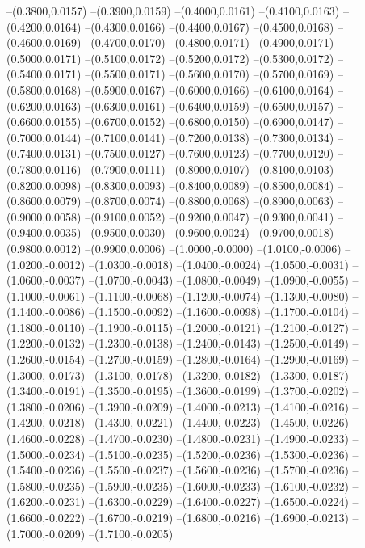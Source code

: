 	--(0.3800,0.0157)
	--(0.3900,0.0159)
	--(0.4000,0.0161)
	--(0.4100,0.0163)
	--(0.4200,0.0164)
	--(0.4300,0.0166)
	--(0.4400,0.0167)
	--(0.4500,0.0168)
	--(0.4600,0.0169)
	--(0.4700,0.0170)
	--(0.4800,0.0171)
	--(0.4900,0.0171)
	--(0.5000,0.0171)
	--(0.5100,0.0172)
	--(0.5200,0.0172)
	--(0.5300,0.0172)
	--(0.5400,0.0171)
	--(0.5500,0.0171)
	--(0.5600,0.0170)
	--(0.5700,0.0169)
	--(0.5800,0.0168)
	--(0.5900,0.0167)
	--(0.6000,0.0166)
	--(0.6100,0.0164)
	--(0.6200,0.0163)
	--(0.6300,0.0161)
	--(0.6400,0.0159)
	--(0.6500,0.0157)
	--(0.6600,0.0155)
	--(0.6700,0.0152)
	--(0.6800,0.0150)
	--(0.6900,0.0147)
	--(0.7000,0.0144)
	--(0.7100,0.0141)
	--(0.7200,0.0138)
	--(0.7300,0.0134)
	--(0.7400,0.0131)
	--(0.7500,0.0127)
	--(0.7600,0.0123)
	--(0.7700,0.0120)
	--(0.7800,0.0116)
	--(0.7900,0.0111)
	--(0.8000,0.0107)
	--(0.8100,0.0103)
	--(0.8200,0.0098)
	--(0.8300,0.0093)
	--(0.8400,0.0089)
	--(0.8500,0.0084)
	--(0.8600,0.0079)
	--(0.8700,0.0074)
	--(0.8800,0.0068)
	--(0.8900,0.0063)
	--(0.9000,0.0058)
	--(0.9100,0.0052)
	--(0.9200,0.0047)
	--(0.9300,0.0041)
	--(0.9400,0.0035)
	--(0.9500,0.0030)
	--(0.9600,0.0024)
	--(0.9700,0.0018)
	--(0.9800,0.0012)
	--(0.9900,0.0006)
	--(1.0000,-0.0000)
	--(1.0100,-0.0006)
	--(1.0200,-0.0012)
	--(1.0300,-0.0018)
	--(1.0400,-0.0024)
	--(1.0500,-0.0031)
	--(1.0600,-0.0037)
	--(1.0700,-0.0043)
	--(1.0800,-0.0049)
	--(1.0900,-0.0055)
	--(1.1000,-0.0061)
	--(1.1100,-0.0068)
	--(1.1200,-0.0074)
	--(1.1300,-0.0080)
	--(1.1400,-0.0086)
	--(1.1500,-0.0092)
	--(1.1600,-0.0098)
	--(1.1700,-0.0104)
	--(1.1800,-0.0110)
	--(1.1900,-0.0115)
	--(1.2000,-0.0121)
	--(1.2100,-0.0127)
	--(1.2200,-0.0132)
	--(1.2300,-0.0138)
	--(1.2400,-0.0143)
	--(1.2500,-0.0149)
	--(1.2600,-0.0154)
	--(1.2700,-0.0159)
	--(1.2800,-0.0164)
	--(1.2900,-0.0169)
	--(1.3000,-0.0173)
	--(1.3100,-0.0178)
	--(1.3200,-0.0182)
	--(1.3300,-0.0187)
	--(1.3400,-0.0191)
	--(1.3500,-0.0195)
	--(1.3600,-0.0199)
	--(1.3700,-0.0202)
	--(1.3800,-0.0206)
	--(1.3900,-0.0209)
	--(1.4000,-0.0213)
	--(1.4100,-0.0216)
	--(1.4200,-0.0218)
	--(1.4300,-0.0221)
	--(1.4400,-0.0223)
	--(1.4500,-0.0226)
	--(1.4600,-0.0228)
	--(1.4700,-0.0230)
	--(1.4800,-0.0231)
	--(1.4900,-0.0233)
	--(1.5000,-0.0234)
	--(1.5100,-0.0235)
	--(1.5200,-0.0236)
	--(1.5300,-0.0236)
	--(1.5400,-0.0236)
	--(1.5500,-0.0237)
	--(1.5600,-0.0236)
	--(1.5700,-0.0236)
	--(1.5800,-0.0235)
	--(1.5900,-0.0235)
	--(1.6000,-0.0233)
	--(1.6100,-0.0232)
	--(1.6200,-0.0231)
	--(1.6300,-0.0229)
	--(1.6400,-0.0227)
	--(1.6500,-0.0224)
	--(1.6600,-0.0222)
	--(1.6700,-0.0219)
	--(1.6800,-0.0216)
	--(1.6900,-0.0213)
	--(1.7000,-0.0209)
	--(1.7100,-0.0205)
